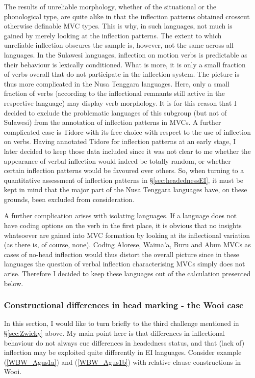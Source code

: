 The results of unreliable morphology, whether of the situational or the phonological type, are quite alike in that the inflection patterns obtained crosscut otherwise definable MVC types. This is why, in such languages, not much is gained by merely looking at the inflection patterns. The extent to which unreliable inflection obscures the sample is, however, not the same across all languages. In the Sulawesi languages, inflection on motion verbs is predictable as their behaviour is lexically conditioned. What is more, it is only a small fraction of verbs overall that do not participate in the inflection system. The picture is thus more complicated in the Nusa Tenggara languages. Here, only a small fraction of verbs (according to the inflectional remnants still active in the respective language) may display verb morphology. It is for this reason that I decided to exclude the problematic languages of this subgroup (but not of Sulawesi) from the annotation of inflection patterns in MVCs. A further complicated case is Tidore with its free choice with respect to the use of inflection on verbs. Having annotated Tidore for inflection patterns at an early stage, I later decided to keep those data included since it was not clear to me whether the appearance of verbal inflection would indeed be totally random, or whether certain inflection patterns would be favoured over others. So, when turning to a quantitative assessment of inflection patterns in §\ref{sec:headednessEI}, it must be kept in mind that the major part of the Nusa Tenggara languages have, on these grounds, been excluded from consideration.

A further complication arises with isolating languages. If a language does not have coding options on the verb in the first place, it is obvious that no insights whatsoever are gained into MVC formation by looking at its inflectional variation (as there is, of course, none). Coding Alorese, Waima'a, Buru and Abun MVCs as cases of no-head inflection would thus distort the overall picture since in these languages the question of verbal inflection characterising MVCs simply does not arise. Therefore I decided to keep these languages out of the calculation presented below.

\subsubsection{Constructional differences in head marking - the Wooi case}\label{sec:wooicase}

In this section, I would like to turn briefly to the third challenge mentioned in §\ref{sec:Zwicky} above. My main point here is that differences in inflectional behaviour do not always cue differences in headedness status, and that (lack of) inflection may be exploited quite differently in EI languages. Consider example (\ref{WBW_Agus1a}) and (\ref{WBW_Agus1b}) with relative clause constructions in Wooi.


